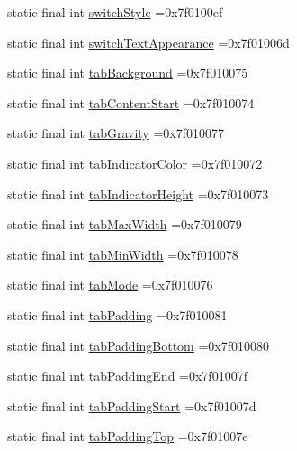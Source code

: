 \begin{DoxyCompactItemize}
\item 
static final int \hyperlink{classcheck_1_1test_1_1_r_1_1attr_a9ae7872d556d50683fe08cd498d71991}{switch\+Style} =0x7f0100ef
\item 
static final int \hyperlink{classcheck_1_1test_1_1_r_1_1attr_a208fa18b2eaf663f264d200f28ca74c2}{switch\+Text\+Appearance} =0x7f01006d
\item 
static final int \hyperlink{classcheck_1_1test_1_1_r_1_1attr_a90d48386b6c277d4bb8f496ca85d7fa4}{tab\+Background} =0x7f010075
\item 
static final int \hyperlink{classcheck_1_1test_1_1_r_1_1attr_af4fc4df4ea303d1145e27e9279ff4f2e}{tab\+Content\+Start} =0x7f010074
\item 
static final int \hyperlink{classcheck_1_1test_1_1_r_1_1attr_aa338d973c780b029f86890fee9cdcd55}{tab\+Gravity} =0x7f010077
\item 
static final int \hyperlink{classcheck_1_1test_1_1_r_1_1attr_a7c3852dcc199564747fe365fccae05f5}{tab\+Indicator\+Color} =0x7f010072
\item 
static final int \hyperlink{classcheck_1_1test_1_1_r_1_1attr_a274b66d412bade0510cae3077354f9be}{tab\+Indicator\+Height} =0x7f010073
\item 
static final int \hyperlink{classcheck_1_1test_1_1_r_1_1attr_a4891fae4f27ae76a2dd289815ab27d96}{tab\+Max\+Width} =0x7f010079
\item 
static final int \hyperlink{classcheck_1_1test_1_1_r_1_1attr_ad78063e863c2df7fa0fdcc6222541690}{tab\+Min\+Width} =0x7f010078
\item 
static final int \hyperlink{classcheck_1_1test_1_1_r_1_1attr_a813adba1ffde6ec58ce835911d9db617}{tab\+Mode} =0x7f010076
\item 
static final int \hyperlink{classcheck_1_1test_1_1_r_1_1attr_a7a7f8dc9a8192875a3695243aa9e8285}{tab\+Padding} =0x7f010081
\item 
static final int \hyperlink{classcheck_1_1test_1_1_r_1_1attr_aa4e3f622e42c4b3fd08ed0f5308d4b2c}{tab\+Padding\+Bottom} =0x7f010080
\item 
static final int \hyperlink{classcheck_1_1test_1_1_r_1_1attr_a5d95af079992521323154cf2aa35dfaa}{tab\+Padding\+End} =0x7f01007f
\item 
static final int \hyperlink{classcheck_1_1test_1_1_r_1_1attr_a196c7359dff257a9caccdbaa14a63e0b}{tab\+Padding\+Start} =0x7f01007d
\item 
static final int \hyperlink{classcheck_1_1test_1_1_r_1_1attr_a85de95c6d92d95bb3ca0cc41458d1e48}{tab\+Padding\+Top} =0x7f01007e

\end{DoxyCompactItemize}
